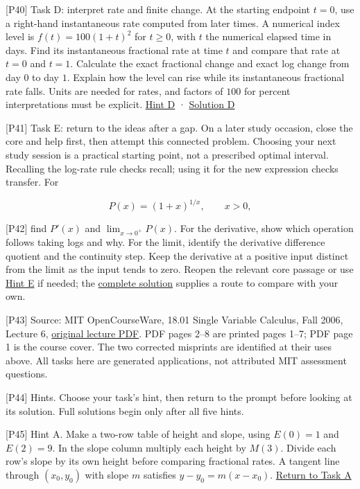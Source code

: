 \documentclass[
  11pt,
]{article}
\providecommand{\gt}{>}
\begin{document}
{[}P40{]} Task D: interpret rate and finite change. At the starting
endpoint \(t=0\), use a right-hand instantaneous rate computed from
later times. A numerical index level is \(f(t)=100(1+t)^2\) for
\(t\ge0\), with \(t\) the numerical elapsed time in days. Find its
instantaneous fractional rate at time \(t\) and compare that rate at
\(t=0\) and \(t=1\). Calculate the exact fractional change and exact log
change from day \(0\) to day \(1\). Explain how the level can rise while
its instantaneous fractional rate falls. Units are needed for rates, and
factors of \(100\) for percent interpretations must be explicit.
\protect\hyperlink{hint-d}{Hint D} ·
\protect\hyperlink{solution-d}{Solution D}

{[}P41{]} Task E: return to the ideas after a gap. On a later study
occasion, close the core and help first, then attempt this connected
problem. Choosing your next study session is a practical starting point,
not a prescribed optimal interval. Recalling the log-rate rule checks
recall; using it for the new expression checks transfer. For

\[
P(x)=(1+x)^{1/x},\qquad x\gt0,
\]

{[}P42{]} find \(P'(x)\) and \(\lim_{x\to0^+}P(x)\). For the derivative,
show which operation follows taking logs and why. For the limit,
identify the derivative difference quotient and the continuity step.
Keep the derivative at a positive input distinct from the limit as the
input tends to zero. Reopen the relevant core passage or use
\protect\hyperlink{hint-e}{Hint E} if needed; the
\protect\hyperlink{solution-e}{complete solution} supplies a route to
compare with your own.

{[}P43{]} Source: MIT OpenCourseWare, 18.01 Single Variable Calculus,
Fall 2006, Lecture 6,
\href{https://ocw.mit.edu/courses/18-01-single-variable-calculus-fall-2006/f9af0e98490296c99d330faf47389507_lec6.pdf}{original
lecture PDF}. PDF pages 2--8 are printed pages 1--7; PDF page 1 is the
course cover. The two corrected misprints are identified at their uses
above. All tasks here are generated applications, not attributed MIT
assessment questions.

{[}P44{]} Hints. Choose your task's hint, then return to the prompt
before looking at its solution. Full solutions begin only after all five
hints.

{[}P45{]} Hint A. Make a two-row table of height and slope, using
\(E(0)=1\) and \(E(2)=9\). In the slope column multiply each height by
\(M(3)\). Divide each row's slope by its own height before comparing
fractional rates. A tangent line through \((x_0,y_0)\) with slope \(m\)
satisfies \(y-y_0=m(x-x_0)\). \protect\hyperlink{task-a}{Return to Task
A}
\end{document}
